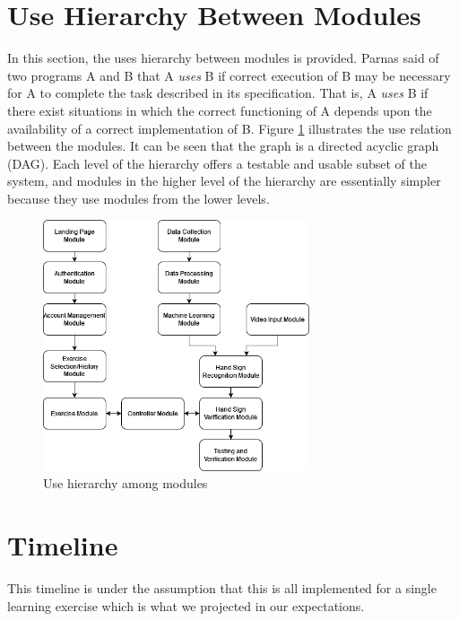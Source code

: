 \documentclass[12pt, titlepage]{article}
\begin{document}
\section{Use Hierarchy Between Modules} \label{SecUse}

In this section, the uses hierarchy between modules is
provided. Parnas said of two programs A and B that A {\em uses} B if
correct execution of B may be necessary for A to complete the task described in
its specification. That is, A {\em uses} B if there exist situations in which
the correct functioning of A depends upon the availability of a correct
implementation of B.  Figure \ref{FigUH} illustrates the use relation between
the modules. It can be seen that the graph is a directed acyclic graph
(DAG). Each level of the hierarchy offers a testable and usable subset of the
system, and modules in the higher level of the hierarchy are essentially simpler
because they use modules from the lower levels.

\begin{figure}[H]
\centering
\includegraphics[width=0.7\textwidth]{UsesHierarchy.png}
\caption{Use hierarchy among modules}
\label{FigUH}
\end{figure}

\section{Timeline}
This timeline is under the assumption that this is all implemented for a single learning exercise which is what we projected in our expectations.
\end{document}
